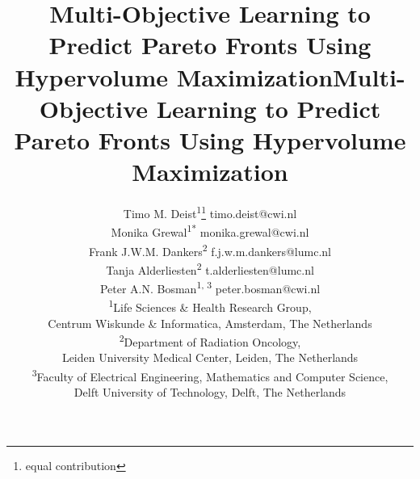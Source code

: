 \title{Multi-Objective Learning to Predict Pareto Fronts Using Hypervolume Maximization}



\title{Multi-Objective Learning to Predict Pareto Fronts Using Hypervolume Maximization}

\author{\name Timo M. Deist\textsuperscript{1}\thanks{equal contribution}
        \email timo.deist@cwi.nl \\
       \AND
       \name Monika Grewal\textsuperscript{1}\textsuperscript{*}
       \email monika.grewal@cwi.nl \\
       \AND
       \name Frank J.W.M. Dankers\textsuperscript{2}
       \email f.j.w.m.dankers@lumc.nl \\
       \AND
       \name Tanja Alderliesten\textsuperscript{2}
       \email t.alderliesten@lumc.nl \\
       \AND
       \name Peter A.N. Bosman\textsuperscript{1, 3}
       \email peter.bosman@cwi.nl \\
       
       \addr \textsuperscript{1}Life Sciences \& Health Research Group,\\
       Centrum Wiskunde \& Informatica, Amsterdam, The Netherlands\\
       
       \addr \textsuperscript{2}Department of Radiation Oncology,\\
       Leiden University Medical Center, Leiden, The Netherlands\\
       
       \addr \textsuperscript{3}Faculty of Electrical Engineering, Mathematics and Computer Science,\\
       Delft University of Technology, Delft, The Netherlands
        }

\maketitle

